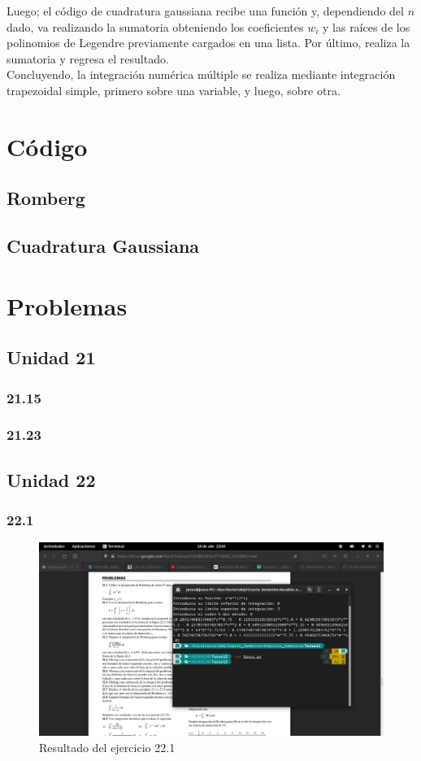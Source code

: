 \documentclass[12pt,oneside,FLEQN]{report}
\begin{document}
{Luego; el código de cuadratura gaussiana recibe una función y, dependiendo del $n$ dado, va realizando la sumatoria obteniendo los coeficientes $w_{i}$ y las raíces de los polinomios de Legendre previamente cargados en una lista. Por último, realiza la sumatoria y regresa el resultado.\\

Concluyendo, la integración numérica múltiple se realiza mediante integración trapezoidal simple, primero sobre una variable, y luego, sobre otra.
\section{Código}
	\subsection{Romberg}
	
	\subsection{Cuadratura Gaussiana}
	
\section{Problemas}
	\subsection{Unidad 21}
		\subsubsection{21.15}
		\subsubsection{21.23}
	\subsection{Unidad 22}
		\subsubsection{22.1}
		\begin{figure}[!h]
			\centering
			\includegraphics[scale=0.3]{221.png}
			\caption{Resultado del ejercicio 22.1}
		\end{figure}
}
\end{document}
